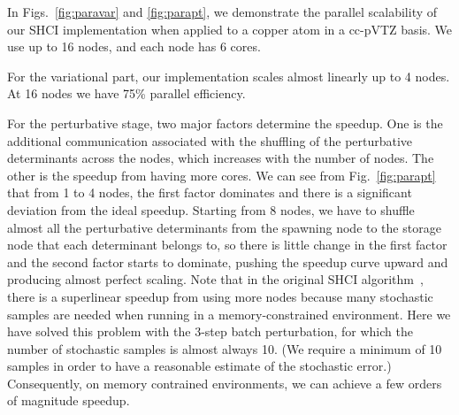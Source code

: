 \documentclass[%
reprint,
 superscriptaddress,
 amsmath,amssymb,
 aps,
]{revtex4-1}
\begin{document}
In Figs.~\ref{fig:paravar} and \ref{fig:parapt}, we demonstrate the parallel scalability of our SHCI implementation
when applied to a copper atom in a cc-pVTZ basis. We use up to 16 nodes, and each node has 6 cores.

For the variational part, our implementation scales almost linearly up to 4 nodes.
At 16 nodes we have 75\% parallel efficiency.

For the perturbative stage, two major factors determine the speedup.
One is the additional communication associated with
the shuffling of the perturbative determinants across the nodes, which increases with the number of nodes.
The other is the speedup from having more cores.
We can see from Fig.~\ref{fig:parapt} that from 1 to 4 nodes, the first factor dominates and there is a significant deviation from the ideal speedup.
Starting from 8 nodes, we have to shuffle almost all the perturbative determinants from the spawning node to the storage node that each determinant belongs to,
so there is little change in the first factor and the second factor starts to dominate, pushing the speedup curve upward and producing almost perfect scaling.
Note that in the original SHCI algorithm~\cite{ShaHolJeaAlaUmr-JCTC-17}, there is a superlinear speedup from using more nodes
because many stochastic samples are needed when running in a memory-constrained environment.
Here we have solved this problem with the 3-step batch perturbation, for which the number of stochastic samples
is almost always 10.  (We require a minimum of 10 samples in order to have a reasonable estimate of the stochastic error.)
Consequently, 
on memory contrained environments,
we can achieve a few orders of magnitude speedup.
\end{document}
